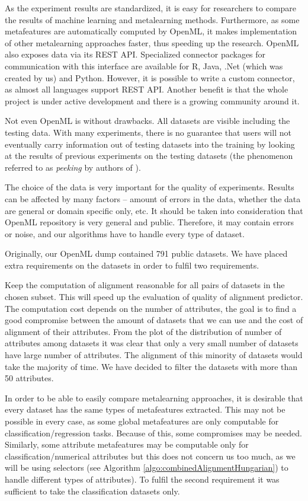 \documentclass{article}
\begin{document}
\begin{refsegment}
As the experiment results are standardized, it is easy for researchers to compare the results of machine learning and metalearning methods. Furthermore, as some metafeatures are automatically computed by OpenML, it makes implementation of other metalearning approaches faster, thus speeding up the research. OpenML also exposes data via its REST API. Specialized connector packages for communication with this interface are available for R, Java, .Net (which was created by us) and Python. However, it is possible to write a custom connector, as almost all languages support REST API. Another benefit is that the whole project is under active development and there is a growing community around it. 

Not even  OpenML is without drawbacks. All datasets are visible including the testing data. With many experiments, there is no guarantee that users will not eventually carry information out of testing datasets into the training by looking at the results of previous experiments on the testing datasets (the phenomenon referred to as \emph{peeking} by authors of \cite{aima3ed}). 

The choice of the data is very important for the quality of experiments. Results can be affected by many factors -- amount of errors in the data, whether the data are general or domain specific only, etc. It should be taken into consideration that OpenML repository is very general and public. Therefore, it may contain errors or noise, and our algorithms have to handle every type of dataset.

Originally, our OpenML dump contained 791 public datasets. We have placed extra requirements on the datasets in order to fulfil two requirements.

Keep the computation of alignment reasonable for all pairs of datasets in the chosen subset. This will speed up the evaluation of quality of alignment predictor. The computation cost depends on the number of attributes, the goal is to find a good compromise between the amount of datasets that we can use and the cost of alignment of their attributes. From the plot of the distribution of number of attributes among datasets it was clear that only a very small number of datasets have large number of attributes. The alignment of this minority of datasets would take the majority of time. We have decided to filter the datasets with more than 50 attributes.
	
In order to be able to easily compare metalearning approaches, it is desirable that every dataset has the same types of metafeatures extracted. This may not be possible in every case, as some global metafeatures are only computable for classification/regression tasks. Because of this, some compromises may be needed. Similarly, some attribute metafeatures may be computable only for classification/numerical attributes but this does not concern us too much, as we will be using selectors (see Algorithm \ref{algo:combinedAlignmentHungarian}) to handle different types of attributes). To fulfil the second requirement it was sufficient to take the classification datasets only.


\end{refsegment}
\end{document}
